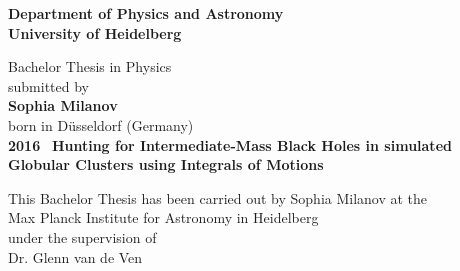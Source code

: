 \begin{titlepage}
\begin{center}
 
\Large\textbf{Department of Physics and Astronomy\\
University of Heidelberg}

\vspace{15cm}

\normalsize
Bachelor Thesis in Physics\\
submitted by \\
\vspace{0.5cm}
\Large\textbf{Sophia Milanov}\\
\normalsize
\vspace{0.5cm}
born in Düsseldorf (Germany)\\
\vspace{0.5cm}
\Large\textbf{2016}
\normalsize
\newpage
\mbox{}
\thispagestyle{empty}
\newpage
\
\Large\textbf{Hunting for Intermediate-Mass Black Holes in simulated Globular Clusters using Integrals of Motions}

\vspace{18cm}

\normalsize
This Bachelor Thesis has been carried out by Sophia Milanov at the\\
Max Planck Institute for Astronomy in Heidelberg\\
under the supervision of\\
Dr. Glenn van de Ven

\vfill
\end{center}

\end{titlepage}
